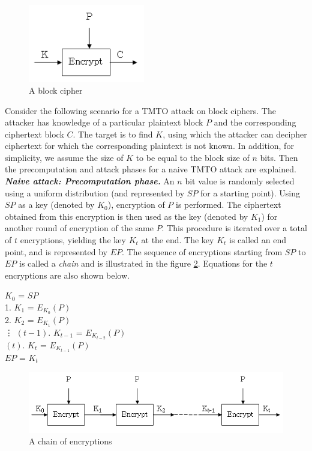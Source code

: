 \begin{figure}[ht!]
	\centering
		\includegraphics[width=2in]{./figures/block-cipher.PNG}
	\caption{A block cipher}	
	\label{fig:block-cipher}
\end{figure}

Consider the following scenario for a TMTO attack on block ciphers. The attacker has knowledge of a particular plaintext block $P$ and the corresponding ciphertext block $C$. The target is to find $K$, using which the attacker can decipher ciphertext for which the corresponding plaintext is not known. In addition, for simplicity, we assume the size of $K$ to be equal to the block size of $n$ bits. Then the precomputation and attack phases for a naive TMTO attack are explained.\\

\noindent \textit{\textbf{Naive attack: Precomputation phase.}} An $n$ bit value is randomly selected using a uniform distribution (and represented by $SP$ for a starting point). Using $SP$ as a key (denoted by $K_0$), encryption of $P$ is performed. The ciphertext obtained from this encryption is then used as the key (denoted by $K_1$) for another round of encryption of the same $P$. This procedure is iterated over a total of $t$ encryptions, yielding the key $K_t$ at the end. The key $K_t$ is called an end point, and is represented by $EP$. The sequence of encryptions starting from $SP$ to $EP$ is called a \emph{chain} and is illustrated in the figure \ref{fig:block-cipher-single-chain}. Equations for the $t$ encryptions are also shown below. 

\begin{center}
$K_0$ = $SP$\\
1. $K_1$ = $E_{K_0}(P)$\\
2. $K_2$ = $E_{K_1}(P)$\\
\vdots
$(t-1)$. $K_{t-1}$ = $E_{K_{t-2}}(P)$\\
$(t)$. $K_{t}$ = $E_{K_{t-1}}(P)$\\
$EP$ = $K_{t}$\\
\end{center}

\begin{figure}[ht!]
	\centering
		\includegraphics[width=5.5in]{./figures/block-cipher-single-chain.PNG}
	\caption{A chain of encryptions}	
	\label{fig:block-cipher-single-chain}
\end{figure}

